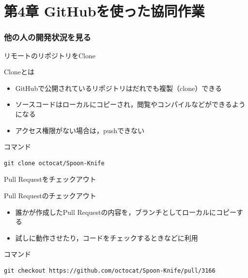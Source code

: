 \documentclass[t, aspectratio=169]{beamer}
\begin{document}
\part{第4章 GitHubを使った協同作業}
\label{sec-4}
\section{他の人の開発状況を見る}
\label{sec-4-1}
\begin{frame}[fragile,label=sec-4-1-1]{リモートのリポジトリをClone}
 \begin{block}{Cloneとは}
\begin{itemize}
\item GitHubで公開されているリポジトリはだれでも複製（clone）できる
\item ソースコードはローカルにコピーされ，閲覧やコンパイルなどができるようになる
\item アクセス権限がない場合は，pushできない
\end{itemize}
\end{block}

\begin{block}{コマンド}
\begin{verbatim}
git clone octocat/Spoon-Knife
\end{verbatim}
\end{block}
\end{frame}
\begin{frame}[fragile,label=sec-4-1-2]{Pull Requestをチェックアウト}
 \begin{block}{Pull Requestのチェックアウト}
\begin{itemize}
\item 誰かが作成したPull Requestの内容を，ブランチとしてローカルにコピーする
\item 試しに動作させたり，コードをチェックするときなどに利用
\end{itemize}
\end{block}

\begin{block}{コマンド}
\begin{verbatim}
git checkout https://github.com/octocat/Spoon-Knife/pull/3166
\end{verbatim}
\end{block}
\end{frame}
\end{document}
